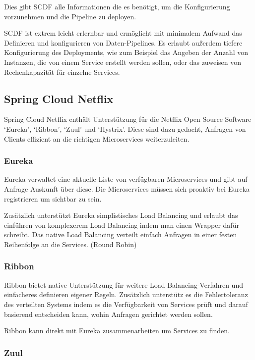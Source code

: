 \documentclass{article}
\begin{document}
Dies gibt SCDF alle Informationen die es benötigt, um die Konfigurierung vorzunehmen und die Pipeline zu deployen.

SCDF ist extrem leicht erlernbar und ermöglicht mit minimalem Aufwand das Definieren und konfigurieren von Daten-Pipelines.
Es erlaubt außerdem tiefere Konfigurierung des Deployments, wie zum Beispiel das Angeben der Anzahl von Instanzen, die von einem Service erstellt werden sollen, oder das zuweisen von Rechenkapazität für einzelne Services.

\subsection{Spring Cloud Netflix}

Spring Cloud Netflix enthält Unterstützung für die Netflix Open Source Software `Eureka', `Ribbon', `Zuul' und `Hystrix'.
Diese sind dazu gedacht, Anfragen von Clients effizient an die richtigen Microservices weiterzuleiten.

\subsubsection{Eureka}

Eureka verwaltet eine aktuelle Liste von verfügbaren Microservices und gibt auf Anfrage Auskunft über diese.
Die Microservices müssen sich proaktiv bei Eureka registrieren um sichtbar zu sein.

Zusätzlich unterstützt Eureka simplistisches Load Balancing und erlaubt das einführen von komplexerem Load Balancing indem man einen Wrapper dafür schreibt.
Das native Load Balancing verteilt einfach Anfragen in einer festen Reihenfolge an die Services. (Round Robin)

\subsubsection{Ribbon}

Ribbon bietet native Unterstützung für weitere Load Balancing-Verfahren und einfacheres definieren eigener Regeln.
Zusätzlich unterstütz es die Fehlertoleranz des verteilten Systems indem es die Verfügbarkeit von Services prüft und darauf basierend entscheiden kann, wohin Anfragen gerichtet werden sollen.

Ribbon kann direkt mit Eureka zusammenarbeiten um Services zu finden.

\subsubsection{Zuul}
\end{document}
